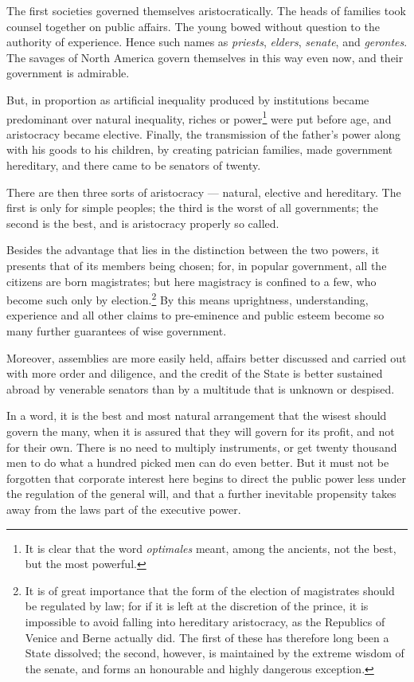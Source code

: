 \documentclass[12pt]{book}
\begin{document}
The first societies governed themselves aristocratically. The heads of families took counsel together on public affairs. The young bowed without question to the authority of experience. Hence such names as \textit{priests}, \textit{elders}, \textit{senate}, and \textit{gerontes}. The savages of North America govern themselves in this way even now, and their government is admirable.

But, in proportion as artificial inequality produced by institutions became predominant over natural inequality, riches or power\footnote{It is clear that the word \textit{optimales} meant, among the ancients, not the best, but the most powerful.} were put before age, and aristocracy became elective. Finally, the transmission of the father's power along with his goods to his children, by creating patrician families, made government hereditary, and there came to be senators of twenty.

There are then three sorts of aristocracy — natural, elective and hereditary. The first is only for simple peoples; the third is the worst of all governments; the second is the best, and is aristocracy properly so called.

Besides the advantage that lies in the distinction between the two powers, it presents that of its members being chosen; for, in popular government, all the citizens are born magistrates; but here magistracy is confined to a few, who become such only by election.\footnote{It is of great importance that the form of the election of magistrates should be regulated by law; for if it is left at the discretion of the prince, it is impossible to avoid falling into hereditary aristocracy, as the Republics of Venice and Berne actually did. The first of these has therefore long been a State dissolved; the second, however, is maintained by the extreme wisdom of the senate, and forms an honourable and highly dangerous exception.} By this means uprightness, understanding, experience and all other claims to pre-eminence and public esteem become so many further guarantees of wise government.

Moreover, assemblies are more easily held, affairs better discussed and carried out with more order and diligence, and the credit of the State is better sustained abroad by venerable senators than by a multitude that is unknown or despised.

In a word, it is the best and most natural arrangement that the wisest should govern the many, when it is assured that they will govern for its profit, and not for their own. There is no need to multiply instruments, or get twenty thousand men to do what a hundred picked men can do even better. But it must not be forgotten that corporate interest here begins to direct the public power less under the regulation of the general will, and that a further inevitable propensity takes away from the laws part of the executive power.
\end{document}
